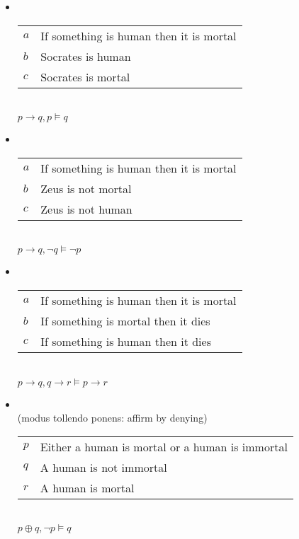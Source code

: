 \documentclass[headrule,footrule]{foils}
\begin{document}

\begin{itemize}
\item {}
\\[2ex]
  \begin{tabular}{ll}
    $a$ & If something is human then it is mortal \\
    $b$ & Socrates is human \\ \hline
    $c$ & Socrates is mortal
  \end{tabular}
\\ $p \rightarrow q, p \models q$
\item {}
\\[2ex]
  \begin{tabular}{ll}
    $a$ & If something is human then it is mortal \\
    $b$ & Zeus is not mortal \\ \hline
    $c$ & Zeus is not human
  \end{tabular}
\\ $p \rightarrow q, \neg q \models \neg p$

\newpage
\item {}
\\[2ex]
 \begin{tabular}{ll}
    $a$ & If something is human then it is mortal \\
    $b$ & If something is mortal then it dies \\ \hline
    $c$ & If something is human then it dies
  \end{tabular}
\\ $p \rightarrow q, q \rightarrow r \models p \rightarrow r$
\item {}
\\ (modus tollendo ponens: affirm by denying)
\\[2ex]
 \begin{tabular}{ll}
    $p$ & Either a human is mortal or a human is immortal \\
    $q$ & A human is not immortal \\ \hline
    $r$ & A human is mortal
  \end{tabular}
\\ $p \oplus q, \neg p \models q$
\end{itemize}
\end{document}
